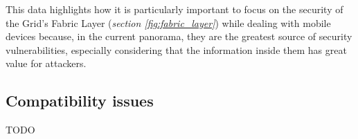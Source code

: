 This data highlights how it is particularly important to focus on the security of the Grid's Fabric Layer (\textit{section \ref{fig:fabric_layer}}) while dealing with mobile devices because, in the current panorama, they are the greatest source of security vulnerabilities, especially considering that the information inside them has great value for attackers.

\subsection{Compatibility issues}
TODO
